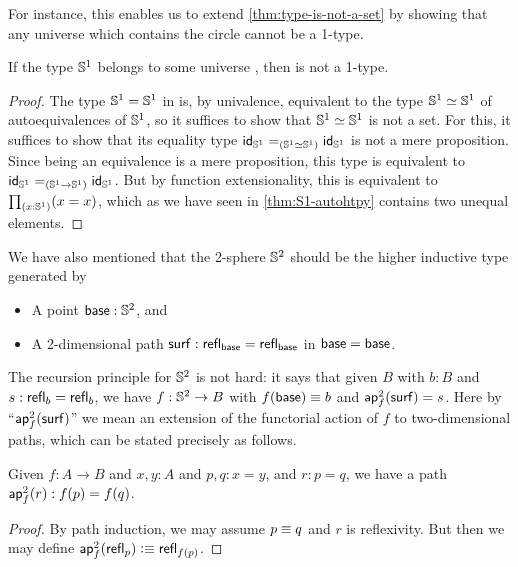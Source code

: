 For instance, this enables us to extend \autoref{thm:type-is-not-a-set} by showing that any universe which contains the circle cannot be a 1-type.

\begin{cor}
  If the type $\Sn^1$ belongs to some universe \type, then \type is not a 1-type.
\end{cor}
\begin{proof}
  The type $\Sn^1=\Sn^1$ in \type is, by univalence, equivalent to the type $\eqv{\Sn^1}{\Sn^1}$ of auto\-equivalences of $\Sn^1$, so it suffices to show that $\eqv{\Sn^1}{\Sn^1}$ is not a set.
  For this, it suffices to show that its equality type $\id[(\eqv{\Sn^1}{\Sn^1})]{\idfunc[\Sn^1]}{\idfunc[\Sn^1]}$ is not a mere proposition.
  Since being an equivalence is a mere proposition, this type is equivalent to $\id[(\Sn^1\to\Sn^1)]{\idfunc[\Sn^1]}{\idfunc[\Sn^1]}$.
  But by function extensionality, this is equivalent to $\prd{x:\Sn^1} (x=x)$, which as we have seen in \autoref{thm:S1-autohtpy} contains two unequal elements.
\end{proof}

%

%
%
We have also mentioned that the 2-sphere $\Sn^2$ should be the higher inductive type generated by
\begin{itemize}
\item A point $\base:\Sn^2$, and
\item A 2-dimensional path $\surf:\refl{\base} = \refl{\base}$ in ${\base=\base}$.
\end{itemize}
%
The recursion principle for $\Sn^2$ is not hard: it says that given $B$ with $b:B$ and $s:\refl b = \refl b$, we have $f:\Sn^2\to B$ with $f(\base)\jdeq b$ and $\aptwo f \surf = s$.
Here by ``$\aptwo f \surf$'' we mean an extension of the functorial action of $f$ to two-dimensional paths, which can be stated precisely as follows.

\begin{lem}\label{thm:ap2}
  Given $f:A\to B$ and $x,y:A$ and $p,q:x=y$, and $r:p=q$, we have a path $\aptwo f r : \ap f p = \ap f q$.
\end{lem}
\begin{proof}
  By path induction, we may assume $p\jdeq q$ and $r$ is reflexivity.
  But then we may define $\aptwo f {\refl p} \defeq \refl{\ap f p}$.
\end{proof}

